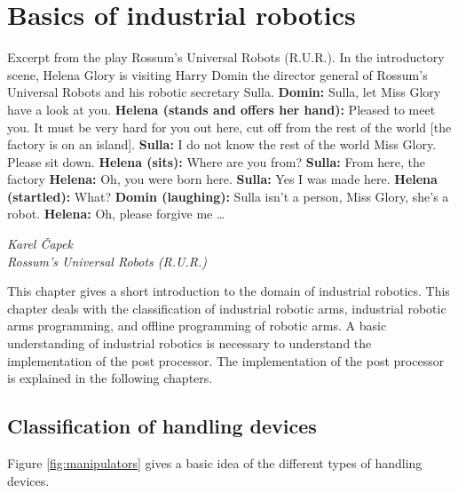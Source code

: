 ﻿\chapter{Basics of industrial robotics \label{chap:basics}}

\epigraph{

Excerpt from the play Rossum’s Universal Robots (R.U.R.).\break
In the introductory scene, Helena Glory is visiting Harry Domin the director general of Rossum’s Universal Robots and his robotic secretary Sulla.\break
\break
\textbf{Domin:} Sulla, let Miss Glory have a look at you.\break
\textbf{Helena (stands and offers her hand):} Pleased to meet you. It must be very hard for you out here, cut off from the rest of the world [the factory is on an island].\break
\textbf{Sulla:} I do not know the rest of the world Miss Glory. Please sit down.\break
\textbf{Helena (sits):} Where are you from?\break
\textbf{Sulla:} From here, the factory\break
\textbf{Helena:} Oh, you were born here.\break
\textbf{Sulla:} Yes I was made here.\break
\textbf{Helena (startled):} What?\break
\textbf{Domin (laughing):} Sulla isn’t a person, Miss Glory, she’s a robot.\break
\textbf{Helena:} Oh, please forgive me …
}{\textit{Karel Čapek \\ Rossum’s Universal Robots (R.U.R.)}}

This chapter gives a short introduction to the domain of industrial robotics. This chapter deals with the classification of industrial robotic arms, industrial robotic arms programming, and offline programming of robotic arms. A basic understanding of industrial robotics is necessary to understand the implementation of the post processor. The implementation of the post processor is explained in the following chapters.

\section{Classification of handling devices}

Figure \ref{fig:manipulators} gives a basic idea of the different types of handling devices. 


